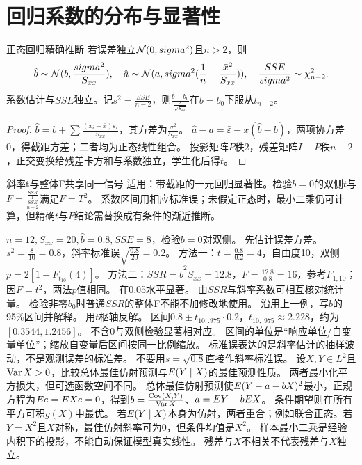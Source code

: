 \section{回归系数的分布与显著性}\label{sec:94}
\begin{theorem}{正态回归精确推断}
若误差独立$\mathcal N(0,sigma^2)$且$n>2$，则
\[\hat b\sim\mathcal N(b,\dfrac{sigma^2}{S_{xx}}),\quad\hat a\sim\mathcal N(a,sigma^2(\dfrac{1}{n}+\dfrac{\bar x^2}{S_{xx}})),
\quad \dfrac{SSE}{sigma^2}\sim\chi_{n-2}^2.\]
系数估计与$SSE$独立。记$s^2=\frac{SSE}{n-2}$，则$\frac{\hat b-b_0}{\frac{s}{\sqrt{S_{xx}}}}$在$b=b_0$下服从$t_{n-2}$。
\end{theorem}
\begin{proof}
$\hat b=b+\sum\frac{(x_i-\bar x)\varepsilon_i}{S_{xx}}$，其方差为$\frac{\sigma^2}{S_{xx}}$。
$\hat a-a=\bar\varepsilon-\bar x(\hat b-b)$，两项协方差0，得截距方差；二者均为正态线性组合。
投影矩阵$P$秩2，残差矩阵$I-P$秩$n-2$，正交变换给残差卡方和与系数独立，学生化后得$t$。
\end{proof}
\begin{method}{斜率t与整体F共享同一信号}
适用：带截距的一元回归显著性。检验$b=0$的双侧$t$与$F=\frac{\frac{SSR}{1}}{\frac{SSE}{n-2}}$满足$F=T^2$。
系数区间用相应标准误；未假定正态时，最小二乘仍可计算，但精确$t\text{与}F$结论需替换成有条件的渐近推断。
\end{method}
{$n=12,S_{xx}=20,\hat b=0.8,SSE=8$，检验$b=0$对双侧。}
{先估计误差方差。}
{$s^2=\frac{8}{10}=0.8$，斜率标准误$\sqrt{\frac{0.8}{20}}=0.2$。
方法一：$t=\frac{0.8}{0.2}=4$，自由度10，双侧$p=2[1-F_{t_{10}}(4)]$。
方法二：$SSR=\hat b^2S_{xx}=12.8$，$F=\frac{12.8}{0.8}=16$，参考$F_{1,10}$；因$F=t^2$，两法$p$值相同。
在0.05水平显著。}
{由$SSR$与斜率系数可相互核对统计量。}
{检验非零$b_0$时普通$SSR$的整体F不能不加修改地使用。}
{沿用上一例，写$b$的95\%区间并解释。}
{用$t$枢轴反解。}
{区间$0.8\pm t_{10,.975}\cdot0.2$，$t_{10,.975}\approx2.228$，约为$[0.3544,1.2456]$。
不含0与双侧检验显著相对应。
区间的单位是“响应单位/自变量单位”；缩放自变量后区间按同一比例缩放。}
{标准误表达的是斜率估计的抽样波动，不是观测误差的标准差。}
{不要用$s=\sqrt{0.8}$直接作斜率标准误。}
{设$X,Y\in L^2$且$\operatorname{Var} X>0$，比较总体最佳仿射预测与$E(Y\mid X)$的最佳预测性质。}
{两者最小化平方损失，但可选函数空间不同。}
{总体最佳仿射预测使$E(Y-a-bX)^2$最小，正规方程为$E e=E Xe=0$，得到$b=\frac{\operatorname{Cov}(X,Y)}{\operatorname{Var} X}$、$a=E Y-bE X$。
条件期望则在所有平方可积$g(X)$中最优。
若$E(Y\mid X)$本身为仿射，两者重合；例如联合正态。若$Y=X^2$且$X$对称，最佳仿射斜率可为0，但条件均值是$X^2$。}
{样本最小二乘是经验内积下的投影，不能自动保证模型真实线性。}
{残差与$X$不相关不代表残差与$X$独立。}

